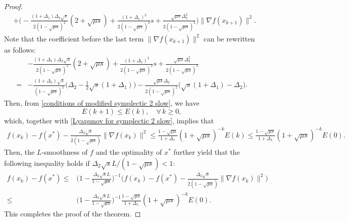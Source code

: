 \documentclass[10pt,a4paper]{amsart}
\begin{document}
\begin{proof}
{\begin{align*}
			&+\big(-\frac{(1+\Delta_1)\Delta_2\sqrt{s}}{2(1-\sqrt{\mu s})^2}(2+\sqrt{\mu s})+\frac{(1+\Delta_1)^2}{2(1-\sqrt{\mu s})^2}s+\frac{\sqrt{\mu s}\Delta_2^2}{2(1-\sqrt{\mu s})^2}\big)\|\nabla f(x_{k+1})\|^2.
        \end{align*}
    }
Note that the coefficient before the last term $\|\nabla f(x_{k+1})\|^2$ can be rewritten as follows:
	\begin{align*}
		&-\frac{(1+\Delta_1)\Delta_2\sqrt{s}}{2(1-\sqrt{\mu s})^2}(2+\sqrt{\mu s})+\frac{(1+\Delta_1)^2}{2(1-\sqrt{\mu s})^2}s+\frac{\sqrt{\mu s}\Delta_2^2}{2(1-\sqrt{\mu s})^2}\\
		=&-\frac{(1+\Delta_1)\sqrt{s}}{(1-\sqrt{\mu s})^2}\big(\Delta_2-\frac{1}{2}\sqrt{s}(1+\Delta_1)\big)-\frac{\sqrt{\mu s}\Delta_2}{2(1-\sqrt{\mu s})^2}\big(\sqrt{s}(1+\Delta_1)-\Delta_2\big).
	\end{align*}
Then, from \ref{conditions of modified symplectic 2 slow}, we have 
	\begin{equation*}
		E(k+1)\leqslant E(k), \quad \forall\, k\ge 0,
	\end{equation*}   
    which, together with \eqref{Lyapunov for symplectic 2 slow}, implies that
	\begin{align*}
		f(x_k)-f(x^*)-\frac{\Delta_2\sqrt{s}}{2(1-\sqrt{\mu s})}\|\nabla f(x_k)\|^2 \leqslant \frac{1-\sqrt{\mu s}}{1+\Delta_1}(1+\sqrt{\mu s})^{-k}E(k)\leqslant \frac{1-\sqrt{\mu s}}{1+\Delta_1}(1+\sqrt{\mu s})^{-k}E(0).
	\end{align*}{
    Then, the $L$-smoothness of $f$ and the optimality of $x^*$ further yield that
     the following inequality holds if $\Delta_2\sqrt{s}L/(1-\sqrt{\mu s})<1$:
    \begin{align*}
        f(x_k)-f(x^*) \leqslant &\Big(1-\frac{\Delta_2\sqrt{s}L}{1-\sqrt{\mu s}}\Big)^{-1} \big( f(x_k)-f(x^*)-\frac{\Delta_2\sqrt{s}}{2(1-\sqrt{\mu s})}\|\nabla f(x_k)\|^2\big)\\
        \leqslant & \Big(1-\frac{\Delta_2\sqrt{s}L}{1-\sqrt{\mu s}}\Big)^{-1}\frac{1-\sqrt{\mu s}}{1+\Delta_1}(1+\sqrt{\mu s})^{-k}E(0).
    \end{align*}
    }
	This completes the proof of the theorem.
\end{proof}
\end{document}
